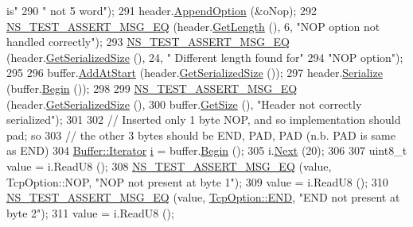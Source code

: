 \begin{DoxyCode}
{       is"}
290                            \textcolor{stringliteral}{" not 5 word"});
291     header.\hyperlink{classns3_1_1TcpHeader_aa5de13df3dd5cb87d63c428e5dcc3425}{AppendOption} (&oNop);
292     \hyperlink{group__testing_ga2a9d78cffb3db8e867c35fff0b698cf5}{NS\_TEST\_ASSERT\_MSG\_EQ} (header.\hyperlink{classns3_1_1TcpHeader_a957928d2dd1108dc1ef8c38daecdcf62}{GetLength} (), 6, \textcolor{stringliteral}{"NOP option not handled
       correctly"});
293     \hyperlink{group__testing_ga2a9d78cffb3db8e867c35fff0b698cf5}{NS\_TEST\_ASSERT\_MSG\_EQ} (header.\hyperlink{classns3_1_1TcpHeader_a1cbb8a10b7838d428f2e94806d3ce807}{GetSerializedSize} (), 24, \textcolor{stringliteral}{"
      Different length found for"}
294                            \textcolor{stringliteral}{"NOP option"});
295 
296     buffer.\hyperlink{classns3_1_1Buffer_a8abd8164c3671d3dadc98fc66fade7b1}{AddAtStart} (header.\hyperlink{classns3_1_1TcpHeader_a1cbb8a10b7838d428f2e94806d3ce807}{GetSerializedSize} ());
297     header.\hyperlink{classns3_1_1TcpHeader_ab492a55e7e9a54ec4938035696877aa3}{Serialize} (buffer.\hyperlink{classns3_1_1Buffer_a893d4bf50df13e730b6cd0fda91b967f}{Begin} ());
298 
299     \hyperlink{group__testing_ga2a9d78cffb3db8e867c35fff0b698cf5}{NS\_TEST\_ASSERT\_MSG\_EQ} (header.\hyperlink{classns3_1_1TcpHeader_a1cbb8a10b7838d428f2e94806d3ce807}{GetSerializedSize} (),
300                            buffer.\hyperlink{classns3_1_1Buffer_a3047b8f2dad303c6370695122f1884f0}{GetSize} (), \textcolor{stringliteral}{"Header not correctly serialized"});
301 
302     \textcolor{comment}{// Inserted only 1 byte NOP, and so implementation should pad; so}
303     \textcolor{comment}{// the other 3 bytes should be END, PAD, PAD (n.b. PAD is same as END)}
304     \hyperlink{classns3_1_1Buffer_1_1Iterator}{Buffer::Iterator} \hyperlink{bernuolliDistribution_8m_a6f6ccfcf58b31cb6412107d9d5281426}{i} = buffer.\hyperlink{classns3_1_1Buffer_a893d4bf50df13e730b6cd0fda91b967f}{Begin} ();
305     i.\hyperlink{classns3_1_1Buffer_1_1Iterator_a5eaa564bdc98d063b7e94b1768aeed6b}{Next} (20);
306 
307     uint8\_t value = i.ReadU8 ();
308     \hyperlink{group__testing_ga2a9d78cffb3db8e867c35fff0b698cf5}{NS\_TEST\_ASSERT\_MSG\_EQ} (value, TcpOption::NOP, \textcolor{stringliteral}{"NOP not present at byte 1"});
309     value = i.ReadU8 ();
310     \hyperlink{group__testing_ga2a9d78cffb3db8e867c35fff0b698cf5}{NS\_TEST\_ASSERT\_MSG\_EQ} (value, \hyperlink{rocketfuel-topology-reader_8cc_a29fd18bed01c4d836c7ebfe73a125c3f}{TcpOption::END}, \textcolor{stringliteral}{"END not present at
       byte 2"});
311     value = i.ReadU8 ();

\end{DoxyCode}
